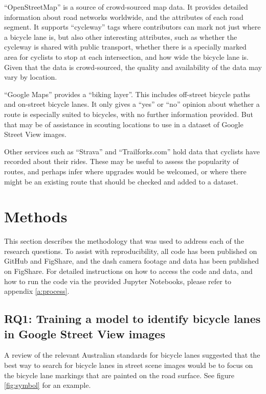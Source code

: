 \documentclass[11pt,twoside]{report}
\begin{document}
``OpenStreetMap'' \cite{OPENSTREETMAP} is a source of crowd-sourced map data.  It provides detailed information about road networks worldwide, and the attributes of each road segment.  It supports ``cycleway'' tags where contributors can mark not just where a bicycle lane is, but also other interesting attributes, such as whether the cycleway is shared with public transport, whether there is a specially marked area for cyclists to stop at each intersection, and how wide the bicycle lane is.  Given that the data is crowd-sourced, the quality and availability of the data may vary by location.

``Google Maps'' provides a ``biking layer''.  This includes off-street bicycle paths and on-street bicycle lanes.  It only gives a ``yes'' or ``no'' opinion about whether a route is especially suited to bicycles, with no further information provided.  But that may be of assistance in scouting locations to use in a dataset of Google Street View images.

Other services such as ``Strava'' and ``Trailforks.com'' hold data that cyclists have recorded about their rides.  These may be useful to assess the popularity of routes, and perhaps infer where upgrades would be welcomed, or where there might be an existing route that should be checked and added to a dataset.


\chapter{Methods}


This section describes the methodology that was used to address each of the research questions.  To assist with reproducibility, all code has been published on GitHub and FigShare, and the dash camera footage and data has been published on FigShare.  For detailed instructions on how to access the code and data, and how to run the code via the provided Jupyter Notebooks, please refer to appendix \ref{a:process}.


\section{RQ1: Training a model to identify bicycle lanes in Google Street View images}
\label{s:rq1}

A review of the relevant Australian standards for bicycle lanes \cite{standards} suggested that the best way to search for bicycle lanes in street scene images would be to focus on the bicycle lane markings that are painted on the road surface.  See figure \ref{fig:symbol} for an example.  
\end{document}
